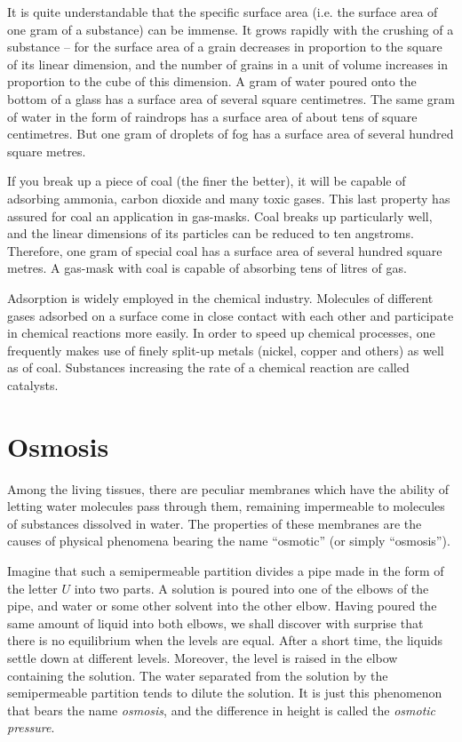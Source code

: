 It is quite understandable that the specific surface area (i.e. the surface area of one gram of a substance) can be immense. It grows rapidly with the crushing of a sub­stance -- for the surface area of a grain decreases in proportion to the square of its linear dimension, and the number of grains in a unit of volume increases in proportion to the cube of this dimension. A gram of water poured onto the bottom of a glass has a surface area of several square centimetres. The same gram of water in the form of raindrops has a surface area of about tens of square centimetres. But one gram of droplets of fog has a surface area of several hundred square metres.

If you break up a piece of coal (the finer the better), it will be capable of adsorbing ammonia, carbon dioxide and many toxic gases. This last property has assured for coal an application in gas-masks. Coal breaks up partic­ularly well, and the linear dimensions of its particles can be reduced to ten angstroms. Therefore, one gram of special coal has a surface area of several hundred square metres. A gas-mask with coal is capable of absorbing tens of litres of gas.

Adsorption is widely employed in the chemical indus­try. Molecules of different gases adsorbed on a surface come in close contact with each other and participate in chemical reactions more easily. In order to speed up chemical processes, one frequently makes use of finely split-up metals (nickel, copper and others) as well as of coal. Substances increasing the rate of a chemical reac­tion are called catalysts.

\section{Osmosis}

Among the living tissues, there are peculiar membranes which have the ability of letting water molecules pass through them, remaining impermeable to molecules of substances dissolved in water. The properties of these membranes are the causes of physical phenomena bearing the name ``osmotic'' (or simply ``osmosis'').

Imagine that such a semipermeable partition divides a pipe made in the form of the letter $U$ into two parts. A solution is poured into one of the elbows of the pipe, and water or some other solvent into the other elbow. Having poured the same amount of liquid into both elbows, we shall discover with surprise that there is no equilibrium when the levels are equal. After a short time, the liquids settle down at different levels. Moreover, the level is raised in the elbow containing the solution. The water separated from the solution by the semipermeable par­tition tends to dilute the solution. It is just this phenom­enon that bears the name \emph{osmosis}, and the difference in height is called the \emph{osmotic pressure}.

